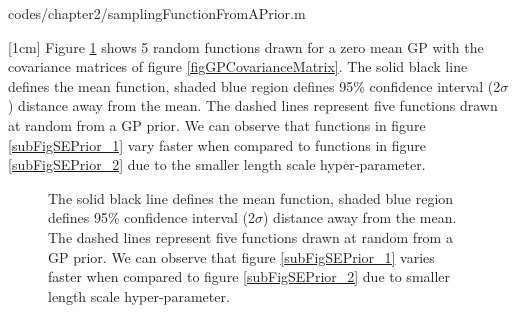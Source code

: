 \begin{mdframed}[hidealllines=true,backgroundcolor=lightgray!20]

                    {codes/chapter2/samplingFunctionFromAPrior.m}
\end{mdframed}

[1cm]
Figure \ref{figGPPriors} shows 5 random functions drawn for a zero mean GP with the covariance matrices of figure \ref{figGPCovarianceMatrix}. The solid black line defines the mean function, shaded blue region defines 95\% confidence interval (2$\sigma$) distance away from the mean. The dashed lines represent five functions drawn at random from a GP prior. We can observe that functions in figure \ref{subFigSEPrior_1} vary faster when compared to functions in figure \ref{subFigSEPrior_2} due to the smaller length scale hyper-parameter. 

\begin{figure}[!ht]
  \centering
    \quad
{}\quad
  
       \caption{The solid black line defines the mean function, shaded blue region defines 95\% confidence interval (2$\sigma$) distance away from the mean. The dashed lines represent five functions drawn at random from a GP prior. We can observe that figure \ref{subFigSEPrior_1} varies faster when compared to figure \ref{subFigSEPrior_2} due to smaller length scale hyper-parameter.       }\label{figGPPriors}
\end{figure}




